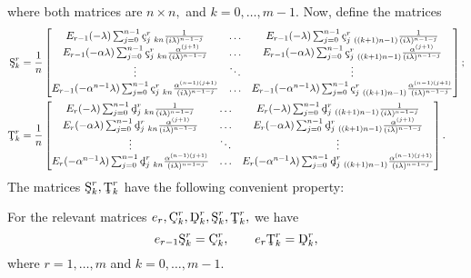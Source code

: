\documentclass[10pt,reqno,oneside,a4paper]{article}
\begin{document}
where both matrices are $n \times n,$ and $k = 0, \ldots, m-1.$ Now, define the matrices
\begin{align*}
\textup{\c{S}}^r_k &= \frac{1}{n}
\begin{bmatrix}
E_{r-1}(-\lambda) \sum^{n-1}_{j=0} \textup{\c{c}}_{j~ kn}^r\frac{1}{(i\lambda)^{n-1-j}} & \ldots & E_{r-1}(-\lambda) \sum^{n-1}_{j=0} \textup{\c{c}}_{j~ ((k+1)n-1)}^r\frac{1}{(i\lambda)^{n-1-j}} \\
E_{r-1}(-\alpha \lambda) \sum^{n-1}_{j=0} \textup{\c{c}}_{j~ kn}^r\frac{\alpha^{(j+1)}}{(i\lambda)^{n-1-j}} & \ldots & E_{r-1}(-\alpha \lambda) \sum^{n-1}_{j=0} \textup{\c{c}}_{j~ ((k+1)n-1)}^r\frac{\alpha^{(j+1)}}{(i\lambda)^{n-1-j}} \\
\vdots & \ddots & \vdots \\
E_{r-1}(-\alpha^{n-1} \lambda) \sum^{n-1}_{j=0} \textup{\c{c}}_{j~ kn}^r\frac{\alpha^{(n-1)(j+1)}}{(i\lambda)^{n-1-j}} & \ldots & E_{r-1}(-\alpha^{n-1}  \lambda) \sum^{n-1}_{j=0} \textup{\c{c}}_{j~ ((k+1)n-1)}^r\frac{\alpha^{(n-1)(j+1)}}{(i\lambda)^{n-1-j}}
\end{bmatrix}; \\
\textup{\c{T}}^r_k &= 
\frac{1}{n}
\begin{bmatrix}
E_{r}(-\lambda) \sum^{n-1}_{j=0} \textup{\c{d}}_{j~ kn}^r\frac{1}{(i\lambda)^{n-1-j}} & \ldots & E_{r}(-\lambda) \sum^{n-1}_{j=0} \textup{\c{d}}_{j~ ((k+1)n-1)}^r\frac{1}{(i\lambda)^{n-1-j}} \\
E_{r}(-\alpha \lambda) \sum^{n-1}_{j=0} \textup{\c{d}}_{j~ kn}^r\frac{\alpha^{(j+1)}}{(i\lambda)^{n-1-j}} & \ldots & E_{r}(-\alpha \lambda) \sum^{n-1}_{j=0} \textup{\c{d}}_{j~ ((k+1)n-1)}^r\frac{\alpha^{(j+1)}}{(i\lambda)^{n-1-j}} \\
\vdots & \ddots & \vdots \\
E_{r}(-\alpha^{n-1} \lambda) \sum^{n-1}_{j=0} \textup{\c{d}}_{j~ kn}^r\frac{\alpha^{(n-1)(j+1)}}{(i\lambda)^{n-1-j}} & \ldots & E_{r}(-\alpha^{n-1}  \lambda) \sum^{n-1}_{j=0} \textup{\c{d}}_{j~ ((k+1)n-1)}^r\frac{\alpha^{(n-1)(j+1)}}{(i\lambda)^{n-1-j}}
\end{bmatrix}.
\end{align*}
The matrices $\textup{\c{S}}^r_k, \textup{\c{T}}^r_k$ have the following convenient property:
\begin{lem}\label{DtN.A-lemma}
For the relevant matrices $e_r, \textup{\c{C}}^r_k, \textup{\c{D}}^r_k, \textup{\c{S}}^r_k, \textup{\c{T}}^r_k,$ we have
\begin{equation*}
e_{r-1}\textup{\c{S}}^r_k = \textup{\c{C}}^r_k, \qquad e_{r}\textup{\c{T}}^r_k = \textup{\c{D}}^r_k,
\end{equation*}
where $r = 1, \ldots, m$ and $k = 0, \ldots, m-1.$
\end{lem}
\end{document}
